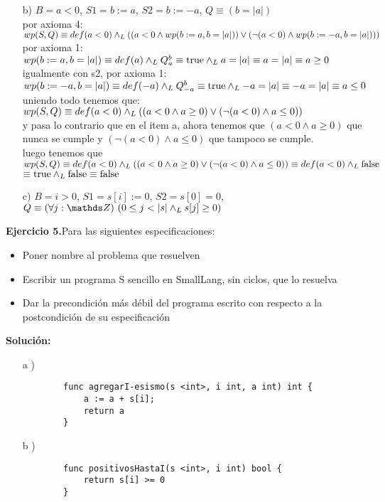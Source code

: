 \documentclass{article}
\begin{document}
\begin{enumerate}
	\item [b)] $B = a < 0$, $S1 = b := a$, $S2 = b := -a$, $Q \equiv (b = |a|)$\\
	por axioma 4: $wp(S,Q) \equiv def(a < 0) \land _L ((a < 0 \land wp(b := a, b = |a|)) \lor (\lnot (a < 0) \land wp(b := -a, b = |a|)))$\\
	por axioma 1: $wp(b := a, b = |a|) \equiv def(a) \land _L Q^{b}_{a} \equiv \mathrm{true} \land _L a = |a| \equiv a = |a| \equiv a \geq 0$\\
	igualmente con s2, por axioma 1: $wp(b := -a, b = |a|) \equiv def(-a) \land _L Q^{b}_{-a} \equiv \mathrm{true} \land _L -a = |a| \equiv -a = |a| \equiv a \leq 0$\\
	uniendo todo tenemos que: $wp(S,Q) \equiv def(a < 0) \land _L ((a < 0 \land a \geq 0) \lor (\lnot (a < 0) \land a \leq 0))$\\
	y pasa lo contrario que en el item a, ahora tenemos que $(a < 0 \land a \geq 0)$ que nunca se cumple y $(\lnot (a < 0) \land a \leq 0)$ que tampoco se cumple.\\
	luego tenemos que $wp(S,Q) \equiv def(a < 0) \land _L ((a < 0 \land a \geq 0) \lor (\lnot (a < 0) \land a \leq 0)) \equiv def(a < 0) \land _L \mathrm{false}$\\
	$\equiv \mathrm{true} \land _L \mathrm{false} \equiv \mathrm{false}$\\

	\item [c)] $B = i > 0$, $S1 = s[i] := 0$, $S2 = s[0] = 0$, $Q \equiv \paraTodo[unalinea]{j}{\ent}{0 \leq j < |s| \yLuego s[j] \geq 0}$
\end{enumerate}

\textbf{Ejercicio 5.}Para las siguientes especificaciones:
\begin{itemize}
	\item Poner nombre al problema que resuelven
	\item Escribir un programa S sencillo en SmallLang, sin ciclos, que lo resuelva
	\item Dar la precondici\'on m\'as d\'ebil del programa escrito con respecto a la postcondici\'on de su especificaci\'on
\end{itemize}
\textbf{Soluci\'on:}
\begin{itemize}
	\item [a])
	\begin{lstlisting}
		func agregarI-esismo(s <int>, i int, a int) int {
			a := a + s[i];
			return a
		}
	\end{lstlisting}
	\item [b])
	\begin{lstlisting}
		func positivosHastaI(s <int>, i int) bool {
			return s[i] >= 0
		}
	\end{lstlisting}
\end{itemize}
\end{document}

